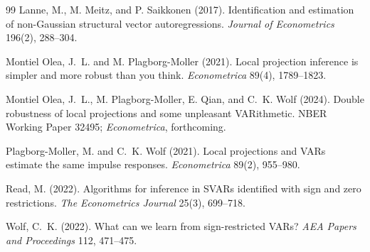 \documentclass[11pt]{article}
\theoremstyle{definition}
\theoremstyle{plain}
\theoremstyle{remark}
\begin{document}
\begin{thebibliography}{99}
Lanne, M., M. Meitz, and P. Saikkonen (2017).
Identification and estimation of non-Gaussian structural vector autoregressions.
\emph{Journal of Econometrics} 196(2), 288--304.

Montiel Olea, J.~L. and M. Plagborg-Moller (2021).
Local projection inference is simpler and more robust than you think.
\emph{Econometrica} 89(4), 1789--1823.

Montiel Olea, J.~L., M. Plagborg-Moller, E. Qian, and C.~K. Wolf (2024).
Double robustness of local projections and some unpleasant VARithmetic.
NBER Working Paper 32495; \emph{Econometrica}, forthcoming.

Plagborg-Moller, M. and C.~K. Wolf (2021).
Local projections and VARs estimate the same impulse responses.
\emph{Econometrica} 89(2), 955--980.

Read, M. (2022).
Algorithms for inference in SVARs identified with sign and zero restrictions.
\emph{The Econometrics Journal} 25(3), 699--718.

Wolf, C.~K. (2022).
What can we learn from sign-restricted VARs?
\emph{AEA Papers and Proceedings} 112, 471--475.
\end{thebibliography}
\end{document}
